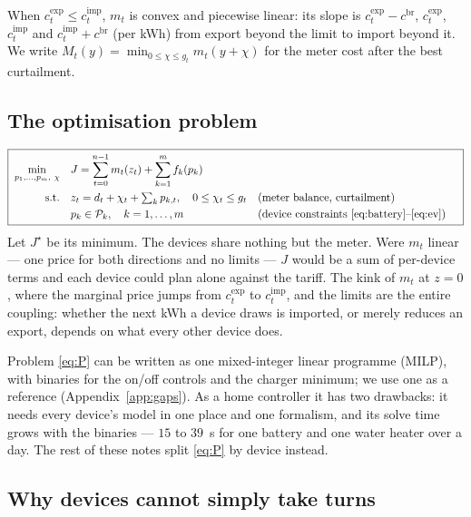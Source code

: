\documentclass[11pt,a4paper]{article}
\newcommand{\cimp}{c^{\mathrm{imp}}}
\newcommand{\cexp}{c^{\mathrm{exp}}}
\newcommand{\cbr}{c^{\mathrm{br}}}
\newcommand{\Pk}{\mathcal P_k}
\begin{document}
When $\cexp_t \le \cimp_t$, $m_t$ is convex and piecewise linear: its slope is
$\cexp_t - \cbr$, $\cexp_t$, $\cimp_t$ and $\cimp_t + \cbr$ (per kWh) from
export beyond the limit to import beyond it. We write
$M_t(y) = \min_{0 \le \chi \le g_t} m_t(y + \chi)$ for the meter cost after the
best curtailment.

\subsection{The optimisation problem}

\begin{equation}
  \boxed{\;
  \begin{aligned}
  \min_{p_1,\dots,p_m,\ \chi}\quad & J = \sum_{t=0}^{n-1} m_t(z_t) + \sum_{k=1}^m f_k(p_k) \\
  \text{s.t.}\quad & z_t = d_t + \chi_t + \textstyle\sum_k p_{k,t}, \quad 0 \le \chi_t \le g_t
     && \text{(meter balance, curtailment)} \\
  & p_k \in \Pk,\quad k = 1,\dots,m
     && \text{(device constraints \eqref{eq:battery}--\eqref{eq:ev})}
  \end{aligned}\;}
  \label{eq:P}
\end{equation}
Let $J^\star$ be its minimum. The devices share nothing but the meter. Were
$m_t$ linear --- one price for both directions and no limits --- $J$ would be a
sum of per-device terms and each device could plan alone against the tariff.
The kink of $m_t$ at $z = 0$, where the marginal price jumps from $\cexp_t$ to
$\cimp_t$, and the limits are the entire coupling: whether the next kWh a
device draws is imported, or merely reduces an export, depends on what every
other device does.

Problem \eqref{eq:P} can be written as one mixed-integer linear programme
(MILP), with binaries for the on/off controls and the charger minimum; we use
one as a reference (Appendix~\ref{app:gaps}). As a home controller it has two
drawbacks: it needs every device's model in one place and one formalism, and
its solve time grows with the binaries --- $15$ to $39$~s for one battery and
one water heater over a day. The rest of these notes split \eqref{eq:P} by
device instead.

\subsection{Why devices cannot simply take turns}
\label{sec:bestresponse}
\end{document}
